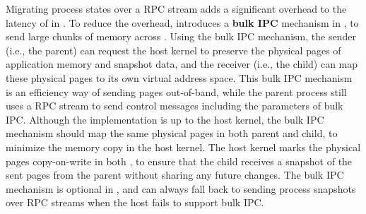 Migrating process states over a RPC stream adds a significant overhead to the latency of  in \thelibos{}.
To reduce the overhead, \graphene{} introduces a {\bf bulk IPC} mechanism in \thehostabi{}, to send large chunks of memory across \picoprocs{}. 
Using the bulk IPC mechanism, 
the sender (i.e., the parent) can request the host kernel
to preserve the physical pages of application memory and snapshot data,
and the receiver (i.e., the child) can map these physical pages to its own virtual address space.
This bulk IPC mechanism is an efficiency way of sending pages out-of-band,
while the parent process still uses a RPC stream
to send control messages including the parameters of bulk IPC.
Although the implementation is up to the host kernel,
the bulk IPC mechanism should map the same physical pages in both parent and child,
to minimize the memory copy in the host kernel.
The host kernel marks the physical pages copy-on-write in both \picoprocs{},
to ensure that the child receives a snapshot of the sent pages from the parent without sharing any future changes.
The bulk IPC mechanism is optional in \thehostabi{},
and \thelibos{} can always fall back to sending process snapshots over RPC streams
when the host fails to support bulk IPC.





\begin{comment}
A critical challenge in developing a Linux library OS was implementing 
handle inheritance in the guest.  In some cases, 
handles are easy to reproduce: an open file can simply be reopened in the child,
and the cursor offset adjusted (note that file handle offsets are a library abstraction
implemented over a memory mapped file).
Pipes, however, are not easily recreated without host support.
\end{comment}

